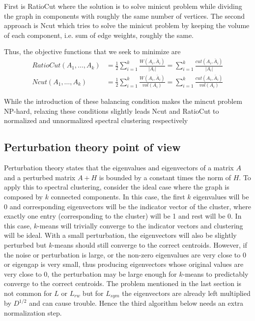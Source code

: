 \documentclass[10pt,a4paper, nocenter]{report}
\begin{document}
        First is RatioCut \cite{hagen-kahng-1992} where the solution is to solve minicut problem while dividing the graph in components with roughly the same number of vertices. The second approach is Ncut \cite{Shi-Malik-maxcut-00} which tries to solve the minicut problem by keeping the volume of each component, i.e. sum of edge weights, roughly the same.
        
        Thus, the objective functions that we seek to minimize are
        \begin{align*}
            RatioCut(A_{1},\dots,A_{k}) &= \frac{1}{2} \sum_{i=1}^{k}\frac{W(A_{i},\bar{A}_{i})}{\lvert A_{i} \rvert}
            = \sum_{i=1}^{k}\frac{cut(A_{i},\bar{A}_{i})}{\lvert A_{i} \rvert} \\
            Ncut(A_{1},\dots,A_{k}) &= \frac{1}{2}\sum_{i=1}^{k}\frac{W(A_{i},\bar{A}_{i})}{vol(A_{i})} = 
            \sum_{i=1}^{k}\frac{cut(A_{i},\bar{A}_{i})}{vol(A_{i})}
        \end{align*}
    
        While the introduction of these balancing condition makes the mincut problem NP-hard, relaxing these conditions slightly leads Ncut and RatioCut to normalized and unnormalized spectral clustering respectively \cite{Luxburg2007}

    \subsection{Perturbation theory point of view}
        Perturbation theory states that the eigenvalues and eigenvectors of a matrix $A$ and a perturbed matrix $A+H$ is bounded by a constant times the norm of $H$. To apply this to spectral clustering, consider the ideal case where the graph is composed by $k$  connected components. In this case, the first $k$ eigenvalues will be 0 and corresponding eigenvectors will be the indicator vector of the cluster, where exactly one entry (corresponding to the cluster) will be 1 and rest will be 0. In this case, $k$-means will trivially converge to the indicator vectors and clustering will be ideal. With a small perturbation, the eigenvectors will also be slightly perturbed but $k$-means should still converge to the correct centroids. However, if the noise or perturbation is large, or the non-zero eigenvalues are very close to 0 or eigengap is very small, thus producing eigenvectors whose original values are very close to 0, the perturbation may be large enough for $k$-means to predictably converge to the correct centroids. The problem mentioned in the last section is not common for $L$ or $L_{rw}$ but for $L_{sym}$ the eigenvectors are already left multiplied by $D^{1/2}$ and can cause trouble. Hence the third algorithm below \cite{ng-jordan-01} needs an extra normalization step. 
\end{document}
